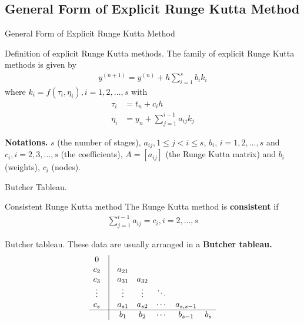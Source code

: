 \documentclass[9pt]{beamer}
\numberwithin{equation}{section}
\begin{document}
\subsection{General Form of Explicit Runge Kutta Method}
\begin{frame}{General Form of Explicit Runge Kutta Method}
\begin{block}{Definition of explicit Runge Kutta methods.}
The family of explicit Runge Kutta methods is given by
\begin{align}
\label{2.1}
{y^{\left( {n + 1} \right)}} = {y^{\left( n \right)}} + h\sum\limits_{i = 1}^s {{b_i}{k_i}} 
\end{align}
where ${k_i} = f\left( {{\tau _i},{\eta _i}} \right), i = 1,2, \ldots ,s$ with 
\begin{align}
\label{2.2}
{\tau _i} &= {t_n} + {c_i}h\\
{\eta _i} &= {y_n} + \sum\limits_{j = 1}^{i - 1} {{a_{ij}}{k_j}} \label{2.3}
\end{align}
\end{block}
\textbf{\textsf{Notations.}} $s$ (the number of stages), $a_{ij},1\le j<i \le s$, $b_i$, $i=1,2,\ldots,s$ and $c_i,i=2,3,\ldots,s$ (the coefficients), $A=\left[a_{ij}\right]$ (the Runge Kutta matrix) and $b_i$ (weights), $c_i$ (nodes).

\end{frame}

\begin{frame}{Butcher Tableau.}
\begin{block}{Consistent Runge Kutta method}
The Runge Kutta method is \textbf{consistent} if 
\begin{align}
\sum\limits_{j = 1}^{i - 1} {{a_{ij}}}  = {c_i},i = 2, \ldots ,s
\end{align}
\end{block}
\begin{block}{Butcher tableau.}
These data are usually arranged in a \textbf{Butcher tableau.}
\begin{align}
\begin{array}{*{20}{c}}
0&\vline& {}&{}&{}&{}&{}\\
{{c_2}}&\vline& {{a_{21}}}&{}&{}&{}&{}\\
{{c_3}}&\vline& {{a_{31}}}&{{a_{32}}}&{}&{}&{}\\
 \vdots &\vline&  \vdots & \vdots & \ddots &{}&{}\\
{{c_s}}&\vline& {{a_{s1}}}&{{a_{s2}}}& \cdots &{{a_{s,s - 1}}}&{}\\
\hline
{}&\vline& {{b_1}}&{{b_2}}& \cdots &{{b_{s - 1}}}&{{b_s}}
\end{array}
\end{align}
\end{block}
\end{frame}
\end{document}

